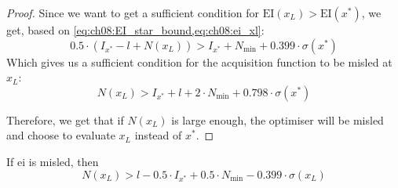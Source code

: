 \begin{proof}
Since we want to get a sufficient condition for $\mathrm{EI}(x_L) > \mathrm{EI}(x^*)$, we get, based on \cref{eq:ch08:EI_star_bound,eq:ch08:ei_xl}:
\begin{equation*}
    0.5 \cdot (I_{x^*} - l + N(x_L)) > I_{x^*} + N_{\min} + 0.399 \cdot \sigma(x^*)
\end{equation*}
Which gives us a sufficient condition for the acquisition function to be misled at $x_L$:
\begin{equation*}
    \label{eq:ch08:ei_misleading}
    N(x_L) > I_{x^*} + l + 2 \cdot N_{\min} + 0.798 \cdot \sigma(x^*)
\end{equation*}

Therefore, we get that if $N(x_L)$ is large enough, the optimiser will be misled and choose to evaluate $x_L$ instead of $x^*$.
\end{proof}

\begin{theorem}
If \gls{ei} is misled, then
\begin{equation*}
    N(x_L) > l - 0.5 \cdot I_{x^*} + 0.5 \cdot N_{\min} - 0.399 \cdot \sigma(x_L)
\end{equation*}

\end{theorem}

